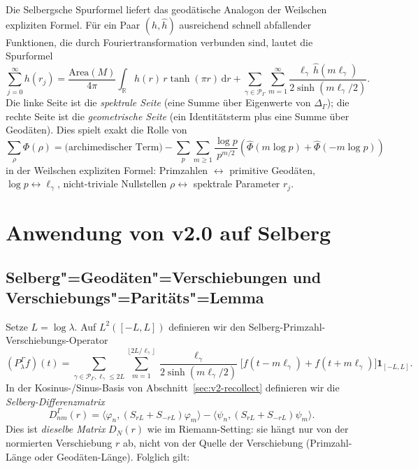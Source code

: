 \documentclass[12pt,a4paper]{article}
\theoremstyle{definition}
\theoremstyle{remark}
\newcommand{\RR}{\mathbb{R}}
\newcommand{\Delop}{\Delta_{\Gamma}}
\begin{document}
Die Selbergsche Spurformel \cite{Selberg1956, Hejhal1976} liefert das
geodätische Analogon der Weilschen expliziten Formel. Für ein Paar
$(h, \hat h)$ ausreichend schnell abfallender Funktionen, die durch Fouriertransformation
verbunden sind, lautet die Spurformel
\begin{equation}
\label{eq:Selberg-trace}
\sum_{j=0}^\infty h(r_j) = \frac{\mathrm{Area}(M)}{4\pi}\int_\RR h(r)\,r\tanh(\pi r)\,\mathrm{d}r
+ \sum_{\gamma \in \mathcal{P}_\Gamma}\sum_{m=1}^\infty \frac{\ell_\gamma\,\hat h(m\ell_\gamma)}{2\sinh(m\ell_\gamma/2)}.
\end{equation}
Die linke Seite ist die \emph{spektrale Seite} (eine Summe über Eigenwerte von
$\Delop$); die rechte Seite ist die \emph{geometrische Seite} (ein Identitätsterm
plus eine Summe über Geodäten). Dies spielt exakt die Rolle von
\begin{equation*}
\sum_\rho \Phi(\rho) = \text{(archimedischer Term)} - \sum_p\sum_{m\ge 1}\frac{\log p}{p^{m/2}}(\hat\Phi(m\log p) + \hat\Phi(-m\log p))
\end{equation*}
in der Weilschen expliziten Formel: Primzahlen $\leftrightarrow$ primitive Geodäten,
$\log p \leftrightarrow \ell_\gamma$, nicht-triviale Nullstellen $\rho \leftrightarrow$
spektrale Parameter $r_j$.

\section{Anwendung von v2.0 auf Selberg}
\label{sec:v2-to-selberg}

\subsection{Selberg"=Geodäten"=Verschiebungen und Verschiebungs"=Paritäts"=Lemma}

Setze $L = \log\lambda$. Auf $L^2([-L, L])$ definieren wir den Selberg-Primzahl-Verschiebungs-Operator
\begin{equation}
\label{eq:PSel}
(P^\Gamma_\lambda f)(t) = \sum_{\gamma \in \mathcal{P}_\Gamma, \ell_\gamma \le 2L}\sum_{m=1}^{\lfloor 2L/\ell_\gamma\rfloor}
\frac{\ell_\gamma}{2\sinh(m\ell_\gamma/2)}\bigl[f(t-m\ell_\gamma) + f(t+m\ell_\gamma)\bigr]\mathbf{1}_{[-L,L]}.
\end{equation}
In der Kosinus-/Sinus-Basis von Abschnitt~\ref{sec:v2-recollect} definieren wir die
\emph{Selberg-Differenzmatrix}
\begin{equation}
\label{eq:DNSel}
D^\Gamma_{nm}(r) = \langle\varphi_n, (S_{rL}+S_{-rL})\varphi_m\rangle - \langle\psi_n, (S_{rL}+S_{-rL})\psi_m\rangle.
\end{equation}
Dies ist \emph{dieselbe Matrix} $D_N(r)$ wie im Riemann-Setting: sie hängt
nur von der normierten Verschiebung $r$ ab, nicht von der Quelle der Verschiebung (Primzahl-Länge
oder Geodäten-Länge). Folglich gilt:
\end{document}
